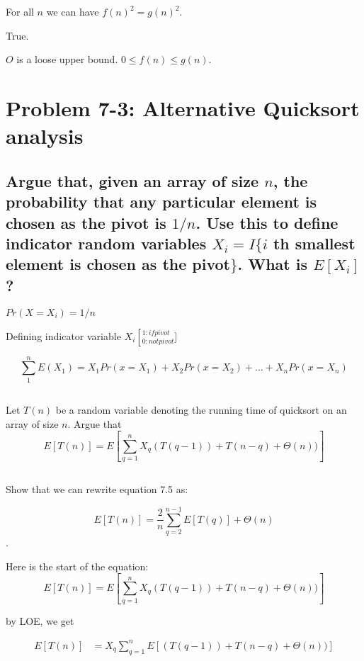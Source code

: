\documentclass[titlepage]{article}\usepackage[]{graphicx}\usepackage[]{color}
\begin{document}
For all $n$ we can have $f(n)^2 = g(n)^2$.



True. 

$O$ is a loose upper bound. $0 \leq f(n) \leq g(n)$. 

\section{ Problem 7-3: Alternative Quicksort analysis}
\subsection{ 
Argue that, given an array of size $n$, the probability that any particular element
is chosen as the pivot is $1/n$. Use this to define indicator random variables
$X_i = I\{ i$ th smallest element is chosen as the pivot$\}$. What is
$E[X_i]$?}

$Pr(X=X_i) = 1/n$

Defining indicator variable $X_i \left[_{0: not pivot}^{1: if pivot}\right.]$

\[ \sum_{1}^{n} E(X_1) = X_1 Pr(x=X_1) + X_2Pr(x = X_2) + \dots + X_n
Pr(x=X_n) \]



\subsection{}
Let $T(n)$ be a random variable denoting the running time of quicksort on an
array of size $n$. Argue that \\
\[ E[T(n)] = E \left[ \sum_{q=1}^{n} X_q (T(q-1)) + T(n-q) + \Theta(n))\right] \]





\subsection{}
Show that we can rewrite equation 7.5 as:

\[ E[T(n) ] = \frac{2}{n} \sum_{q=2}^{n-1} E[T(q)] + \Theta(n) \].


Here is the start of the equation:
\[ E[T(n)] = E \left[ \sum_{q=1}^{n} X_q (T(q-1)) + T(n-q) + \Theta(n))\right] \]

by LOE, we get

\begin{align}
 E[T(n)] &=  X_q \sum_{q=1}^{n} E \left[(T(q-1)) + T(n-q) + \Theta(n))\right] \\
\end{align}
\end{document}
